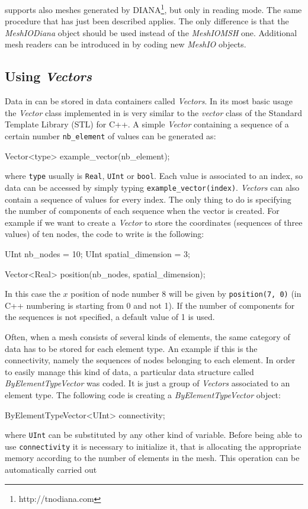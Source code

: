 \akantu supports also meshes generated by
DIANA\footnote{http://tnodiana.com}, but only in reading mode. The
same procedure that has just been described applies. The only
difference is that the \textit{MeshIODiana} object should be used
instead of the \textit{MeshIOMSH} one. Additional mesh readers can be
introduced in \akantu by coding new \textit{MeshIO} objects.

\subsection{Using \textit{Vectors}}

Data in \akantu can be stored in data containers called
\textit{Vectors}. In its most basic usage the \textit{Vector} class
implemented in \akantu is very similar to the \textit{vector} class of
the Standard Template Library (STL) for C++. A simple \textit{Vector}
containing a sequence of a certain number \texttt{nb\_element} of
values can be generated as:
\begin{cpp}
  Vector<type> example_vector(nb_element);
\end{cpp}
where \texttt{type} usually is \texttt{Real}, \texttt{UInt} or
\texttt{bool}. Each value is associated to an index, so data can be
accessed by simply typing
\texttt{example\_vector(index)}. \textit{Vectors} can also contain a
sequence of values for every index. The only thing to do is specifying
the number of components of each sequence when the vector is
created. For example if we want to create a \textit{Vector} to store
the coordinates (sequences of three values) of ten nodes, the code to
write is the following:
\begin{cpp}
  UInt nb_nodes = 10;
  UInt spatial_dimension = 3;

  Vector<Real> position(nb_nodes, spatial_dimension);
\end{cpp}
In this case the $x$ position of node number 8 will be given by
\texttt{position(7, 0)} (in C++ numbering is starting from 0 and not
1). If the number of components for the sequences is not specified, a
default value of 1 is used.

Often, when a mesh consists of several kinds of elements, the same
category of data has to be stored for each element type. An example if
this is the connectivity, namely the sequences of nodes belonging to
each element. In order to easily manage this kind of data, a
particular data structure called \textit{ByElementTypeVector} was
coded. It is just a group of \textit{Vectors} associated to an element
type. The following code is creating a \textit{ByElementTypeVector}
object:
\begin{cpp}
  ByElementTypeVector<UInt> connectivity;
\end{cpp}
where \texttt{UInt} can be substituted by any other kind of
variable. Before being able to use \texttt{connectivity} it is
necessary to initialize it, that is allocating the appropriate memory
according to the number of elements in the mesh. This operation can be
automatically carried out